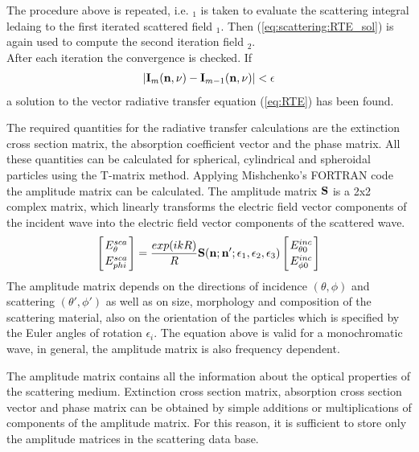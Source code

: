 \label{sec:scattering:conv}

The procedure above is repeated, i.e. \StoVec$_1$ is taken to evaluate
the scattering integral ledaing to the first iterated scattered field
\ScaInt$_1$. Then (\ref{eq:scattering:RTE_sol}) is again used to compute the
second iteration field \StoVec$_2$. \\
After each iteration the convergence is checked. If 
\begin{eqnarray}
|{\bf I}_m ({\bf n}, \nu) -  {\bf I}_{m-1} ({\bf n}, \nu)| < \epsilon
\end{eqnarray}
a solution to the vector radiative transfer equation (\ref{eq:RTE})
has been
found.

\label{sec:scattering:database}

The required quantities for the radiative transfer calculations are
the  extinction cross section matrix, the
absorption coefficient vector and the phase
matrix. All these quantities can be calculated for spherical,
cylindrical and spheroidal particles using the T-matrix
method. Applying Mishchenko's FORTRAN code the amplitude matrix can be calculated. The
amplitude matrix ${\bf S}$ is a 2x2 complex matrix, which linearly transforms 
the electric field vector components of the incident wave into the
electric field vector components of the scattered wave.  
\begin{eqnarray}
  \label{eq:ampl_matrix}
  \left[{E^{sca}_{\theta}\atop E^{sca}_{phi}}\right] =
  \frac{exp(ikR)}{R}{\bf S}({\bf n};{\bf
      n'};\epsilon_1,\epsilon_2,\epsilon_3)\left[{E^{inc}_{\theta
          0}\atop E^{inc}_{\phi 0}}\right] 
\end{eqnarray}
The amplitude matrix depends on the directions of incidence  $(\theta,
\phi)$  and
scattering $(\theta', \phi')$ as  well as on size, morphology and composition of the
scattering material, also on the orientation of the particles which
is specified by the Euler angles of rotation $\epsilon _i$. 
The equation above is valid for a monochromatic wave, in general, the
amplitude matrix is also frequency dependent.

The amplitude matrix contains all the information about the optical
properties of the scattering medium. Extinction cross section
matrix, absorption cross section vector and phase matrix can be
obtained by simple additions or multiplications 
of components of the amplitude matrix. 
For this reason, it is sufficient to store only the amplitude matrices
in the scattering data base. 

